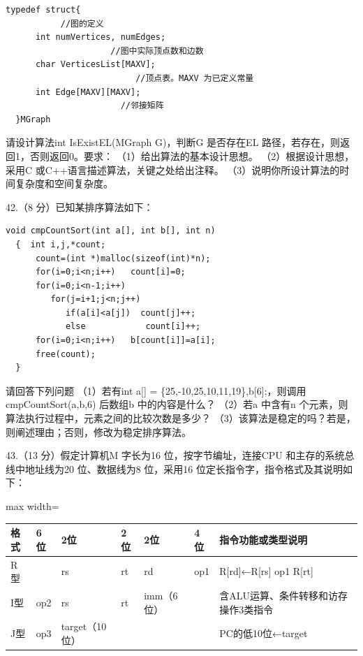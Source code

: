 \documentclass[UTF8,11pt]{ctexart}
\begin{document}
\begin{Verbatim}[breaklines,breakanywhere,fontsize=\small]
typedef struct{
           //图的定义
      int numVertices, numEdges;
                     //图中实际顶点数和边数
      char VerticesList[MAXV];
                          //顶点表。MAXV 为已定义常量
      int Edge[MAXV][MAXV];
                       //邻接矩阵
  }MGraph
\end{Verbatim}

请设计算法int IsExistEL(MGraph G)，判断G 是否存在EL 路径，若存在，则返回1，否则返回0。要求： （1）给出算法的基本设计思想。 （2）根据设计思想，采用C 或C++语言描述算法，关键之处给出注释。 （3）说明你所设计算法的时间复杂度和空间复杂度。


42.（8 分）已知某排序算法如下：


\begin{Verbatim}[breaklines,breakanywhere,fontsize=\small]
void cmpCountSort(int a[], int b[], int n)
  {  int i,j,*count;
      count=(int *)malloc(sizeof(int)*n);
      for(i=0;i<n;i++)   count[i]=0;
      for(i=0;i<n-1;i++)
         for(j=i+1;j<n;j++)
            if(a[i]<a[j])  count[j]++;
            else            count[i]++;
      for(i=0;i<n;i++)   b[count[i]]=a[i];
      free(count);
  }
\end{Verbatim}

请回答下列问题 （1）若有int a[] = \{25,-10,25,10,11,19\},b[6];，则调用cmpCountSort(a,b,6) 后数组b 中的内容是什么？ （2）若a 中含有n 个元素，则算法执行过程中，元素之间的比较次数是多少？ （3）该算法是稳定的吗？若是，则阐述理由；否则，修改为稳定排序算法。


43.（13 分）假定计算机M 字长为16 位，按字节编址，连接CPU 和主存的系统总线中地址线为20 位、数据线为8 位，采用16 位定长指令字，指令格式及其说明如下： 


\begin{center}\begin{adjustbox}{max width=\linewidth}\begin{tabular}{|>{\raggedright\arraybackslash}p{\dimexpr(\linewidth-14\tabcolsep-8\arrayrulewidth)/7\relax}|>{\raggedright\arraybackslash}p{\dimexpr(\linewidth-14\tabcolsep-8\arrayrulewidth)/7\relax}|>{\raggedright\arraybackslash}p{\dimexpr(\linewidth-14\tabcolsep-8\arrayrulewidth)/7\relax}|>{\raggedright\arraybackslash}p{\dimexpr(\linewidth-14\tabcolsep-8\arrayrulewidth)/7\relax}|>{\raggedright\arraybackslash}p{\dimexpr(\linewidth-14\tabcolsep-8\arrayrulewidth)/7\relax}|>{\raggedright\arraybackslash}p{\dimexpr(\linewidth-14\tabcolsep-8\arrayrulewidth)/7\relax}|>{\raggedright\arraybackslash}p{\dimexpr(\linewidth-14\tabcolsep-8\arrayrulewidth)/7\relax}|}\hline
格式 & 6位 & 2位 & 2位 & 2位 & 4位 & 指令功能或类型说明\\\hline
R型 & 000000 & rs & rt & rd & op1 & R[rd]\allowbreak{}←\allowbreak{}R[rs] op1 R[rt]\\\hline
I型 & op2 & rs & rt & imm（6位） &  & 含ALU运算、条件转移和访存操作3类指令\\\hline
J型 & op3 & target（10位） &  &  &  & PC的低10位\allowbreak{}←\allowbreak{}target\\\hline\end{tabular}\end{adjustbox}\end{center}
\end{document}
